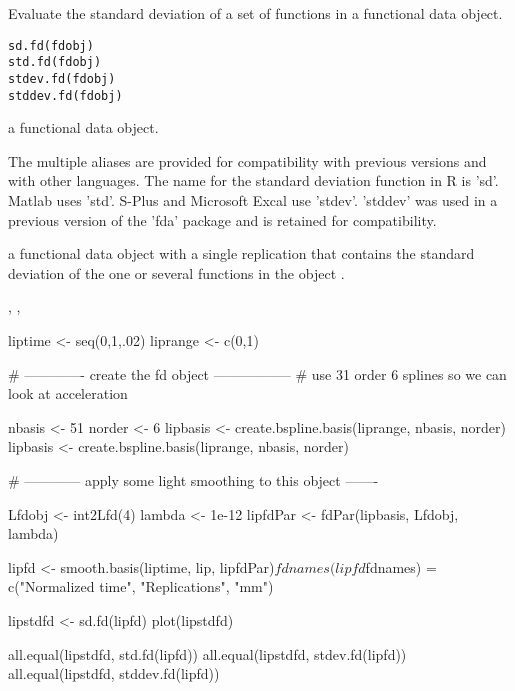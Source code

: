 \documentclass{article}
\begin{document}
\begin{Description}\relax
Evaluate the standard deviation of a set of functions in a functional
data object.
\end{Description}
\begin{Usage}
\begin{verbatim}
sd.fd(fdobj)
std.fd(fdobj)
stdev.fd(fdobj)
stddev.fd(fdobj)
\end{verbatim}
\end{Usage}
\begin{Arguments}
\begin{ldescription}
\item[\code{fdobj}] a functional data object.

\end{ldescription}
\end{Arguments}
\begin{Details}\relax
The multiple aliases are provided for compatibility with previous
versions and with other languages.  The name for the standard
deviation function in R is 'sd'.  Matlab uses 'std'.  S-Plus and
Microsoft Excal use 'stdev'.  'stddev' was used in a previous version
of the 'fda' package and is retained for compatibility.
\end{Details}
\begin{Value}
a functional data object with a single replication
that contains the standard deviation of the one or several functions in
the object .
\end{Value}
\begin{SeeAlso}\relax
{}, 
, 
\end{SeeAlso}
\begin{Examples}
\begin{ExampleCode}
liptime  <- seq(0,1,.02)
liprange <- c(0,1)

#  -------------  create the fd object -----------------
#       use 31 order 6 splines so we can look at acceleration

nbasis <- 51
norder <- 6
lipbasis <- create.bspline.basis(liprange, nbasis, norder)
lipbasis <- create.bspline.basis(liprange, nbasis, norder)

#  ------------  apply some light smoothing to this object  -------

Lfdobj   <- int2Lfd(4)
lambda   <- 1e-12
lipfdPar <- fdPar(lipbasis, Lfdobj, lambda)

lipfd <- smooth.basis(liptime, lip, lipfdPar)$fd
names(lipfd$fdnames) = c("Normalized time", "Replications", "mm")

lipstdfd <- sd.fd(lipfd)
plot(lipstdfd)

all.equal(lipstdfd, std.fd(lipfd))
all.equal(lipstdfd, stdev.fd(lipfd))
all.equal(lipstdfd, stddev.fd(lipfd))

\end{ExampleCode}
\end{Examples}
\end{document}
